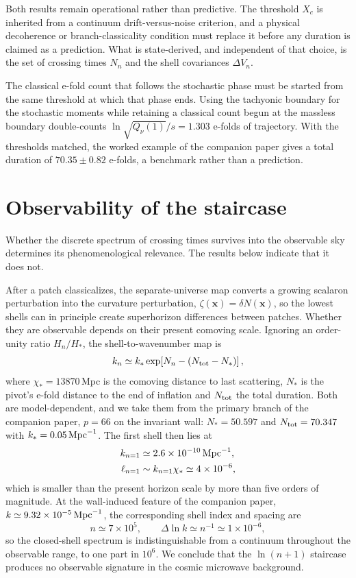 \documentclass[aps,prd,twocolumn,superscriptaddress,nofootinbib,longbibliography]{revtex4-2}
\newcommand{\Mpc}{\,{\rm Mpc}^{-1}}
\begin{document}
Both results remain operational rather than predictive. The threshold
$X_c$ is inherited from a continuum
drift-versus-noise criterion, and a physical decoherence or
branch-classicality condition must replace it before any duration is claimed
as a prediction. What is state-derived, and independent of that choice, is
the set of crossing times $N_n$ and the shell covariances $\Delta V_n$.

The classical e-fold count that follows the stochastic phase must be started
from the same threshold at which that phase ends. Using the tachyonic
boundary for the stochastic moments while retaining a classical count begun
at the massless boundary double-counts $\ln\sqrt{Q_\nu(1)}/s=1.303$ e-folds
of trajectory. With the thresholds matched, the worked example of the
companion paper gives a total duration of $70.35\pm0.82$ e-folds, a
benchmark rather than a prediction.

\section{Observability of the staircase}
\label{sec:observability}
Whether the discrete spectrum of crossing times survives into the
observable sky determines its phenomenological relevance. The results
below indicate that it does not.

After a patch classicalizes, the separate-universe map converts a growing
scalaron perturbation into the curvature perturbation,
$\zeta(\mathbf{x})=\delta N(\mathbf{x})$, so the lowest shells can in
principle create superhorizon differences between patches. Whether they are
observable depends on their present comoving scale. Ignoring an
order-unity ratio $H_n/H_*$, the shell-to-wavenumber map is
\begin{equation}
k_n\simeq k_*\exp\!\left[N_n-(N_{\rm tot}-N_*)\right],
\label{eq:kmap}
\end{equation}
where $\chi_*=13870\,$Mpc is the comoving distance to last scattering,
$N_*$ is the pivot's e-fold distance to the end of inflation and
$N_{\rm tot}$ the total duration. Both are model-dependent, and we take them
from the primary branch of the companion paper, $p=66$ on the invariant
wall: $N_*=50.597$ and $N_{\rm tot}=70.347$ with $k_*=0.05\Mpc$. The first
shell then lies at
\begin{equation}
\begin{aligned}
k_{n=1}&\simeq2.6\times10^{-10}\Mpc,\\
\ell_{n=1}&\sim k_{n=1}\chi_*\simeq4\times10^{-6},
\end{aligned}
\end{equation}
which is smaller than the present horizon scale by more than five orders
of magnitude. At the wall-induced feature of the companion paper,
$k\simeq9.32\times10^{-5}\Mpc$, the corresponding shell index and spacing are
\begin{equation}
n\simeq7\times10^{5},
\qquad
\Delta\ln k\simeq n^{-1}\simeq1\times10^{-6},
\end{equation}
so the closed-shell spectrum is indistinguishable from a continuum
throughout the observable range, to one part in $10^{6}$. We conclude that
the $\ln(n+1)$ staircase produces no observable signature in the cosmic
microwave background.
\end{document}
